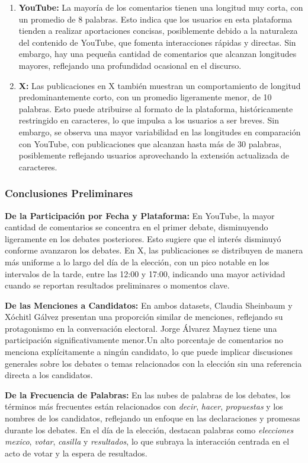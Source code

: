 \documentclass[10pt, a4paper]{article}
\begin{document}
	\begin{enumerate}
		\item \textbf{YouTube:} La mayoría de los comentarios tienen una longitud muy corta, con un promedio de 8 palabras. Esto indica que los usuarios en esta plataforma tienden a realizar aportaciones concisas, posiblemente debido a la naturaleza del contenido de YouTube, que fomenta interacciones rápidas y directas. Sin embargo, hay una pequeña cantidad de comentarios que alcanzan longitudes mayores, reflejando una profundidad ocasional en el discurso.
		
		\item \textbf{X:} Las publicaciones en X también muestran un comportamiento de longitud predominantemente corto, con un promedio ligeramente menor, de 10 palabras. Esto puede atribuirse al formato de la plataforma, históricamente restringido en caracteres, lo que impulsa a los usuarios a ser breves. Sin embargo, se observa una mayor variabilidad en las longitudes en comparación con YouTube, con publicaciones que alcanzan hasta más de 30 palabras, posiblemente reflejando usuarios aprovechando la extensión actualizada de caracteres.
	\end{enumerate}
	
	\subsubsection{Conclusiones Preliminares}
	\textbf{De la Participación por Fecha y Plataforma:} En YouTube, la mayor cantidad de comentarios se concentra en el primer debate, disminuyendo ligeramente en los debates posteriores. Esto sugiere que el interés disminuyó conforme avanzaron los debates. En X, las publicaciones se distribuyen de manera más uniforme a lo largo del día de la elección, con un pico notable en los intervalos de la tarde, entre las 12:00 y 17:00, indicando una mayor actividad cuando se reportan resultados preliminares o momentos clave.
	
	\textbf{De las Menciones a Candidatos:} En ambos datasets, Claudia Sheinbaum y Xóchitl Gálvez presentan una proporción similar de menciones, reflejando su protagonismo en la conversación electoral. Jorge Álvarez Maynez tiene una participación significativamente menor.Un alto porcentaje de comentarios no menciona explícitamente a ningún candidato, lo que puede implicar discusiones generales sobre los debates o temas relacionados con la elección sin una referencia directa a los candidatos.
	
	\textbf{De la Frecuencia de Palabras:} En las nubes de palabras de los debates, los términos más frecuentes están relacionados con \textit{decir}, \textit{hacer}, \textit{propuestas} y los nombres de los candidatos, reflejando un enfoque en las declaraciones y promesas durante los debates. En el día de la elección, destacan palabras como \textit{elecciones mexico}, \textit{votar}, \textit{casilla} y \textit{resultados}, lo que subraya la interacción centrada en el acto de votar y la espera de resultados.
	
\end{document}
